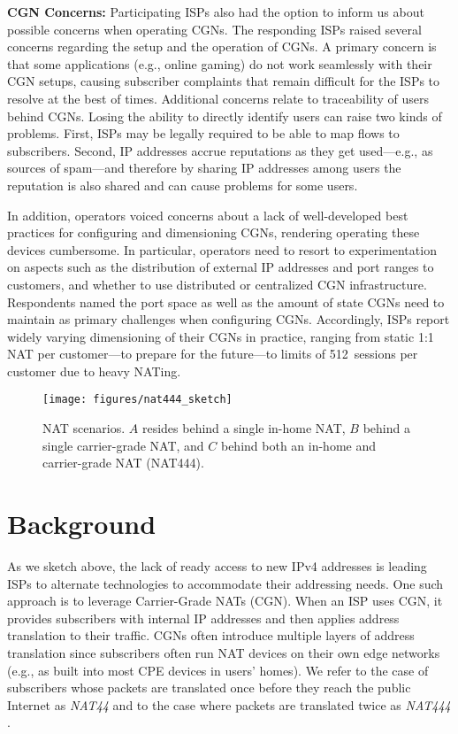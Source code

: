 \documentclass[10pt]{sig-alternate-05-2015}
\newcommand{\parax}[1]{\vspace{0.2em} \noindent \textbf{#1:}}
\begin{document}
\parax{CGN Concerns}
Participating ISPs also had the option to inform us about possible 
concerns when operating CGNs. The responding ISPs raised several concerns 
regarding the setup and the operation of CGNs.  A primary concern is that some 
applications (e.g., online gaming) do not work seamlessly with their CGN setups,
causing subscriber complaints that remain difficult for the ISPs to
resolve at the best of times.  Additional concerns relate to traceability of 
users behind CGNs.  Losing the ability to directly identify users can raise two 
kinds of problems.  First, ISPs may be legally required to be able to map flows 
to subscribers. Second, IP addresses accrue reputations as they get 
used---e.g., as sources of spam---and therefore by sharing IP addresses among 
users the reputation is also shared and can cause problems for some users.

In addition, operators voiced
concerns about a lack of well-developed best practices for configuring
and dimensioning CGNs, rendering operating these devices cumbersome.
In particular, operators need to resort to experimentation on aspects
such as the distribution of external IP addresses and port ranges to
customers, and whether to use distributed or centralized CGN
infrastructure.  Respondents named the port space as well as the
amount of state CGNs need to maintain as primary challenges when
configuring CGNs.  Accordingly, ISPs report widely varying
dimensioning of their CGNs in practice, ranging from static 1:1 NAT
per customer---to prepare for the future---to limits of 512~sessions
per customer due to heavy NATing.



\begin{figure}
\centering
      \texttt{[image: figures/nat444\_sketch]}
      \caption{NAT scenarios. $A$ resides behind a single in-home NAT,
        $B$ behind a single carrier-grade NAT, and $C$ behind both an
        in-home and carrier-grade NAT (NAT444).}
  \label{fig:nat444_sketch}

\end{figure}

\section{Background}
\label{sec:background}

As we sketch above, the lack of ready access to new IPv4 addresses
is leading ISPs to alternate technologies to accommodate their
addressing needs. One such approach is to leverage Carrier-Grade
NATs (CGN). When an ISP uses CGN, it provides subscribers with internal IP 
addresses and then applies address translation to their traffic.  CGNs often 
introduce multiple layers of address translation since subscribers often run NAT
devices on their own edge networks (e.g., as built into most CPE
devices in users' homes). We refer to the case of subscribers whose
packets are translated once before they reach the public Internet as
\textit{NAT44} and to the case where packets are translated twice as
\textit{NAT444} \cite{nat44and444,address_sharing_ton}.
\end{document}
